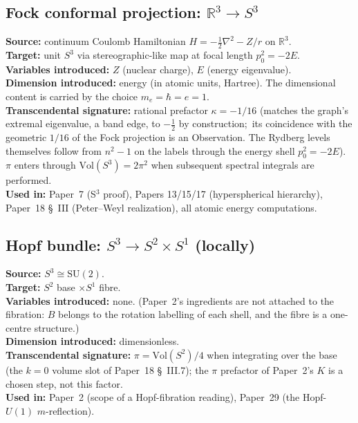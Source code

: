 \documentclass[11pt]{article}
\begin{document}
\subsection{Fock conformal projection: $\mathbb{R}^3 \to S^3$}
\label{sec:proj_fock}
\textbf{Source:} continuum Coulomb Hamiltonian $H = -\tfrac{1}{2}\nabla^2 - Z/r$
on $\mathbb{R}^3$.\\
\textbf{Target:} unit $S^3$ via stereographic-like map at focal
length $p_0^2 = -2E$.\\
\textbf{Variables introduced:} $Z$ (nuclear charge), $E$ (energy
eigenvalue).\\
\textbf{Dimension introduced:} energy (in atomic units, Hartree).
The dimensional content is carried by the choice
$m_e = \hbar = e = 1$.\\
\textbf{Transcendental signature:} rational prefactor
$\kappa = -1/16$ (matches the graph's extremal eigenvalue, a band
edge, to $-\tfrac12$ by construction;\ its coincidence with the
geometric $1/16$ of the Fock projection is an Observation.  The Rydberg levels themselves
follow from $n^2 - 1$ on the labels through the energy shell
$p_0^2 = -2E$).
$\pi$ enters through $\mathrm{Vol}(S^3) = 2\pi^2$ when subsequent
spectral integrals are performed.\\
\textbf{Used in:} Paper~7 (S$^3$ proof), Papers 13/15/17
(hyperspherical hierarchy), Paper~18 \S~III (Peter--Weyl
realization), all atomic energy computations.

\subsection{Hopf bundle: $S^3 \to S^2 \times S^1$ (locally)}
\label{sec:proj_hopf}
\textbf{Source:} $S^3 \cong \mathrm{SU}(2)$.\\
\textbf{Target:} $S^2$ base $\times S^1$ fibre.\\
\textbf{Variables introduced:} none.  (Paper~2's ingredients are not
attached to the fibration: $B$ belongs to the rotation labelling of each
shell, and the fibre is a one-centre structure.)\\
\textbf{Dimension introduced:} dimensionless.\\
\textbf{Transcendental signature:} $\pi = \mathrm{Vol}(S^2)/4$ when
integrating over the base (the $k = 0$ volume slot of Paper~18
\S~III.7); the $\pi$ prefactor of Paper~2's $K$ is a chosen step, not
this factor.\\
\textbf{Used in:} Paper~2 (scope of a Hopf-fibration reading),
Paper~29 (the Hopf-$U(1)$ $m$-reflection).
\end{document}
